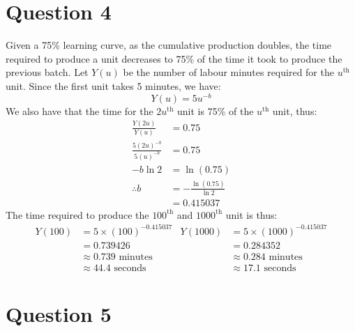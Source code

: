 \documentclass[12pt]{article}
\begin{document}
\section*{Question 4}


Given a 75\% learning curve, as the cumulative production doubles, the time required to produce a unit decreases to 75\% of the time it took to produce the previous batch. Let $Y(u)$ be the number of labour minutes required for the $u^{\text{th}}$ unit. Since the first unit takes 5 minutes, we have: \begin{equation*}
    Y(u) = 5 u^{-b}
\end{equation*} We also have that the time for the $2u^{\text{th}}$ unit is 75\% of the $u^{\text{th}}$ unit, thus: \begin{align*}
    \frac{Y(2u)}{Y(u)} &= 0.75 \\ 
    \frac{5(2u)^{-b}}{5(u)^{-b}} &= 0.75 \\ 
    -b \ln 2 &= \ln (0.75) \\ 
    \therefore b &= - \frac{\ln (0.75)}{\ln 2} \\ 
    &= 0.415037
\end{align*} The time required to produce the $100^{\text{th}}$ and $1000^{\text{th}}$ unit is thus: \begin{align*}
    Y(100) &= 5 \times (100)^{-0.415037}  & Y(1000) &= 5 \times (1000)^{-0.415037} \\ 
    &= 0.739426 & &= 0.284352 \\ 
    &\approx \boxed{0.739 \text{ minutes}} & &\approx \boxed{0.284 \text{ minutes}} \\ 
    &\approx 44.4 \text{ seconds} & &\approx 17.1 \text{ seconds}
\end{align*} 

\newpage 

\section*{Question 5}

% 
% 
%  
% 
% 
%  
% 
% 
% 
\end{document}
